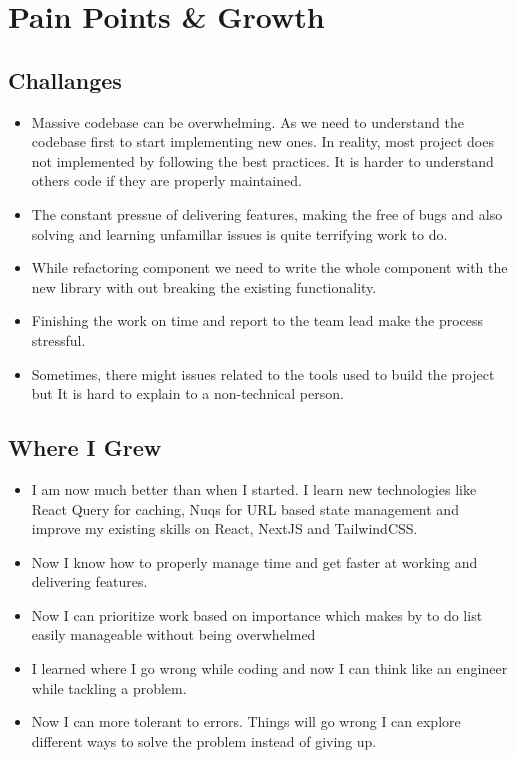 \section{Pain Points \& Growth}

\subsection{Challanges}
\begin{itemize}
    \item Massive codebase can be overwhelming. As we need to understand the codebase first to start implementing new ones. In reality, most project does not implemented by following the best practices. It is harder to understand others code if they are properly maintained. 
    \item The constant pressue of delivering features, making the free of bugs and also solving and learning unfamillar issues is quite terrifying work to do.
    \item While refactoring component we need to write the whole component with the new library with out breaking the existing functionality.
    \item Finishing the work on time and report to the team lead make the process stressful.
    \item Sometimes, there might issues related to the tools used to build the project but It is hard to explain to a non-technical person.
\end{itemize}

\subsection{Where I Grew}
\begin{itemize}
    \item I am now much better than when I started. I learn new technologies like React Query for caching, Nuqs for URL based state management and improve my existing skills on React, NextJS and TailwindCSS.
    \item Now I know how to properly manage time and get faster at working and delivering features.
    \item Now I can prioritize work based on importance which makes by to do list easily manageable without being overwhelmed
    \item I learned where I go wrong while coding and now I can think like an engineer while tackling a problem.
    \item Now I can more tolerant to errors. Things will go wrong I can explore different ways to solve the problem instead of giving up.
\end{itemize}

